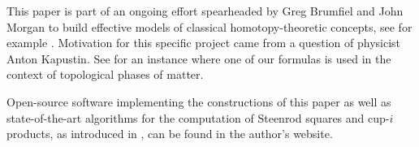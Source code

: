 This paper is part of an ongoing effort spearheaded by Greg Brumfiel and John Morgan to build effective models of classical homotopy-theoretic concepts, see for example \cite{brumfiel2016threedimensional, brumfiel2018quadratic, brumfiel2018fourdimensional}. Motivation for this specific project came from a question of physicist Anton Kapustin. See \cite{kapustin2017fermionic} for an instance where one of our formulas is used in the context of topological phases of matter.

Open-source software implementing the constructions of this paper as well as state-of-the-art algorithms for the computation of Steenrod squares and cup-$i$ products, as introduced in \cite{medina2018persistence}, can be found in the author's website.